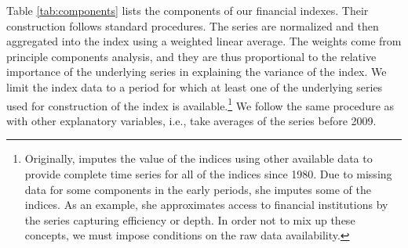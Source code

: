 \documentclass[a4paper,11pt]{article}
\begin{document}
Table \ref{tab:components} lists the components of our financial indexes. Their construction follows standard procedures. The series are normalized and then aggregated into the index using a weighted linear average. The weights come from principle components analysis, and they are thus proportional to the relative importance of the underlying series in explaining the variance of the index. We limit the index data to a period for which at least one of the underlying series used for construction of the index is available.\footnote{Originally, \citet{svirydzenka2016introducing} imputes the value of the indices using other available data to provide complete time series for all of the indices since 1980. Due to missing data for some components in the early periods, she imputes some of the indices. As an example, she approximates access to financial institutions by the series capturing efficiency or depth. In order not to mix up these concepts, we must impose conditions on the raw data availability.} We follow the same procedure as with other explanatory variables, i.e., take averages of the series before 2009.
%
%
\end{document}
